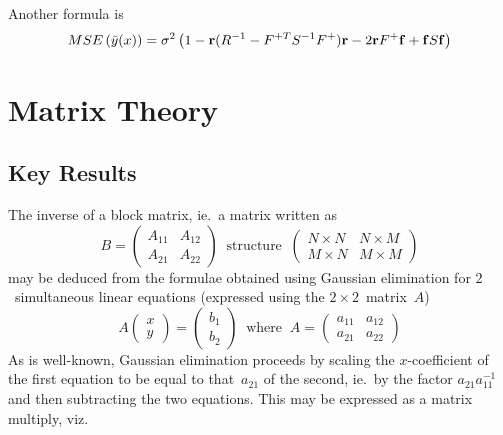 Another  formula is
\begin{equation}\label{eq:msendsubf}
MSE\left(\tilde{y}(x)\right) = \sigma^2\left(1 - {\bf r}(R^{-1} - F^{+T}S^{-1}F^+){\bf r} 
-2 {\bf r} F^+ {\bf f} + {\bf f}S{\bf f} \right) 
\end{equation}

\section{Matrix Theory}\label{sec:matrixth}
\subsection{Key Results}\label{sec:mthkey}
The inverse of a block matrix, ie.\ a matrix written as
\begin{equation}\label{eq:blkmat}
B=\begin{pmatrix}
A_{11} & A_{12} \\
A_{21} & A_{22}
\end{pmatrix}
\;\;\mbox{structure}\;\;
\begin{pmatrix}
N \times N & N \times M \\
M \times N & M \times M
\end{pmatrix}
\end{equation}
may be deduced from the formulae obtained using Gaussian elimination for
$2$~simultaneous linear equations (expressed using  the $2 \times 2$~matrix~$A$)
\begin{equation}
A
\begin{pmatrix}
x \\
y
\end{pmatrix}
=
\begin{pmatrix}
b_1 \\
b_2
\end{pmatrix}
\;\;\mbox{where} \;\;
A=
\begin{pmatrix}
a_{11} & a_{12} \\
a_{21} & a_{22}
\end{pmatrix}
\end{equation}
As is well-known, Gaussian elimination proceeds by scaling the $x$-coefficient of the
first equation to be equal to that~$a_{21}$ of the second, ie.\ by the factor $a_{21} a_{11}^{-1}$
and then subtracting the two equations. This may be expressed as a matrix multiply, viz.

